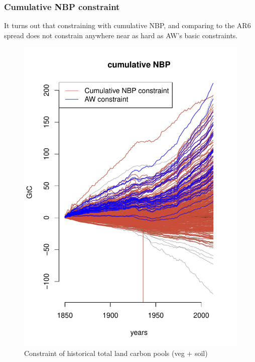 \documentclass[gmd, manuscript]{copernicus}
\begin{document}

\subsubsection{Cumulative NBP constraint}

It turns out that constraining with cumulative NBP, and comparing to the AR6 spread does not constrain anywhere near as hard as AW's basic constraints.

\begin{figure}[t]
\includegraphics[width=12cm]{./graphics/cumulative_nbp_constrained.pdf}
\caption{Constraint of historical total land carbon pools (veg + soil)}
\label{fig:total-land-carbon-sink-1}
\end{figure}
\end{document}
